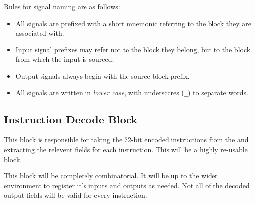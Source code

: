\documentclass{article}
\begin{document}
Rules for signal naming are as follows:
\begin{itemize}
\item All signals are prefixed with a short mnemonic referring to the
    block they are associated with.
\item Input signal prefixes may refer not to the block they belong, but
    to the block from which the input is sourced.
\item Output signals always begin with the source block prefix.
\item All signals are written in {\em lower case}, with underscores ({\tt \_})
    to separate words.
\end{itemize}

\subsection{Instruction Decode Block}

This block is responsible for taking the 32-bit encoded instructions from
the \cpucopif and extracting the relevent fields for each instruction. This
will be a highly re-usable block.

This block will be completely combinatorial. It will be up to the wider
environment to register it's inputs and outputs as needed. Not all of the
decoded output fields will be valid for every instruction.
\end{document}

